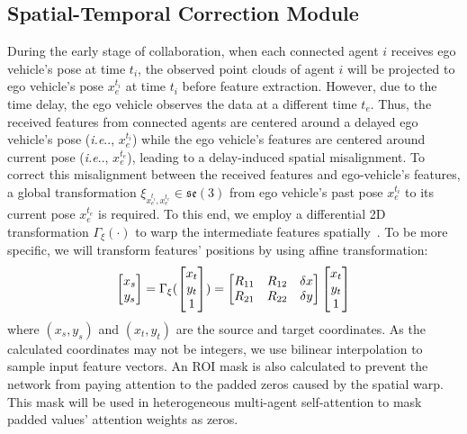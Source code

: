 \documentclass[runningheads]{llncs}
\makeatletter
\DeclareRobustCommand\onedot{\futurelet\@let@token\@onedot}
\def\@onedot{\ifx\@let@token.\else.\null\fi\xspace}
\def\ie{\emph{i.e}\onedot} \def\Ie{\emph{I.e}\onedot}
\makeatother
\begin{document}
\subsection{Spatial-Temporal Correction Module}
\label{sec:stcm}
During the early stage of collaboration, when each connected agent $i$ receives ego vehicle's pose at time $t_i$, the observed point clouds of agent $i$ will be projected to ego vehicle's pose $x_{e}^{t_i}$ at time $t_i$ before feature extraction. However, due to the time delay, the ego vehicle observes the data at a different time $t_e$. Thus, the received features from connected agents are centered around a delayed ego vehicle's pose (\ie, $x_{e}^{t_i}$) while the ego vehicle's features are centered around current pose (\ie, $x_{e}^{t_e}$), leading to a delay-induced spatial misalignment. To correct this misalignment between the received features and ego-vehicle's features, a global transformation ${\xi}_{x_{e}^{t_i}, x_{e}^{t_e}}\in \mathfrak{s e}(3)$ from ego vehicle's past pose $x_e^{t_i}$ to its current pose $x_e^{t_e}$ is required. To this end, we employ a differential 2D transformation ${\Gamma}_{\xi}\left(\cdot\right)$ to warp the intermediate features spatially~\cite{jaderberg2015spatial}. To be more specific, we will transform features' positions by using affine transformation:
\begin{equation}
    \begin{bmatrix}
    x_s\\y_s
    \end{bmatrix}={\Gamma}_{\xi}(
    \begin{bmatrix}
    x_t\\y_t\\1
    \end{bmatrix})\\
    =\begin{bmatrix}
    R_{11}&R_{12}&\delta x\\
    R_{21}&R_{22}&\delta y\\
    \end{bmatrix}\begin{bmatrix}
    x_t\\y_t\\1
    \end{bmatrix}
\end{equation}
where $(x_s,y_s)$ and $(x_t,y_t)$ are the source and target coordinates. As the calculated coordinates may not be integers, we use bilinear interpolation to sample input feature vectors. An ROI mask is also calculated to prevent the network from paying attention to the padded zeros caused by the spatial warp. This mask will be used in heterogeneous multi-agent self-attention to mask padded values' attention weights as zeros. 
\end{document}

